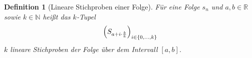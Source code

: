 \documentclass{scrartcl}
\newtheorem{definition}{Definition}
\theoremstyle{definition}
\newtheorem{approximation sequence}{Annäherungsfolge}
\DeclarePairedDelimiter{\set}{\lbrace}{\rbrace}
\DeclarePairedDelimiter{\tuple}{\lparen}{\rparen}
\newcommand{\field}[1]{\mathbb{#1}}
\newcommand{\nats}{\field{N}}
\newcommand{\reals}{\field{R}}
\begin{document}
\begin{definition}[Lineare Stichproben einer Folge]
    Für eine Folge \(s_n\) und \(a, b \in \reals\) sowie \(k \in
    \nats\) heißt das \(k\)-Tupel
    \begin{equation}
        \tuple*{S_{a + i \cdot \frac{b}{k}}}_{i \in \set{0, \ldots, k}}
    \end{equation}
    \(k\) lineare Stichproben der Folge über dem Intervall \([a, b]\).
\end{definition}


%
%
%
%
\end{document}
